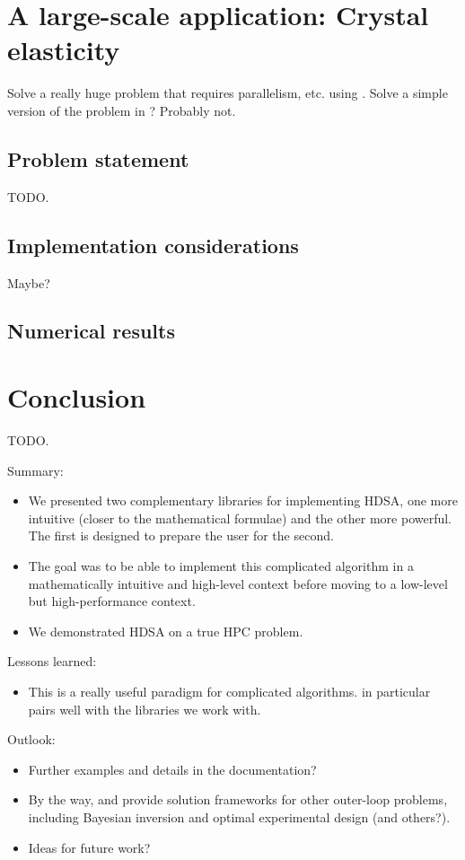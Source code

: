\section{A large-scale application: Crystal elasticity}
\label{sec:application}

\begin{purpose}
Solve a really huge problem that requires parallelism, etc. using \MrHyDE.
Solve a simple version of the problem in \SABL? Probably not.
\end{purpose}

\subsection{Problem statement}

TODO.

\subsection{Implementation considerations}

Maybe?

\subsection{Numerical results}

\section{Conclusion}
\label{sec:conclusion}

TODO.

\begin{purpose}
Summary:
\begin{itemize}
\item We presented two complementary libraries for implementing HDSA, one more intuitive (closer to the mathematical formulae) and the other more powerful. The first is designed to prepare the user for the second.
\item The goal was to be able to implement this complicated algorithm in a mathematically intuitive and high-level context before moving to a low-level but high-performance context.
\item We demonstrated HDSA on a true HPC problem.
\end{itemize}
Lessons learned:
\begin{itemize}
\item This is a really useful paradigm for complicated algorithms.
\MATLAB in particular pairs well with the \cpp libraries we work with.
\end{itemize}
Outlook:
\begin{itemize}
\item Further examples and details in the documentation?
\item By the way, \SABL and \MrHyDE provide solution frameworks for other outer-loop problems, including Bayesian inversion and optimal experimental design (and others?).
\item Ideas for future work?
\end{itemize}
\end{purpose}
